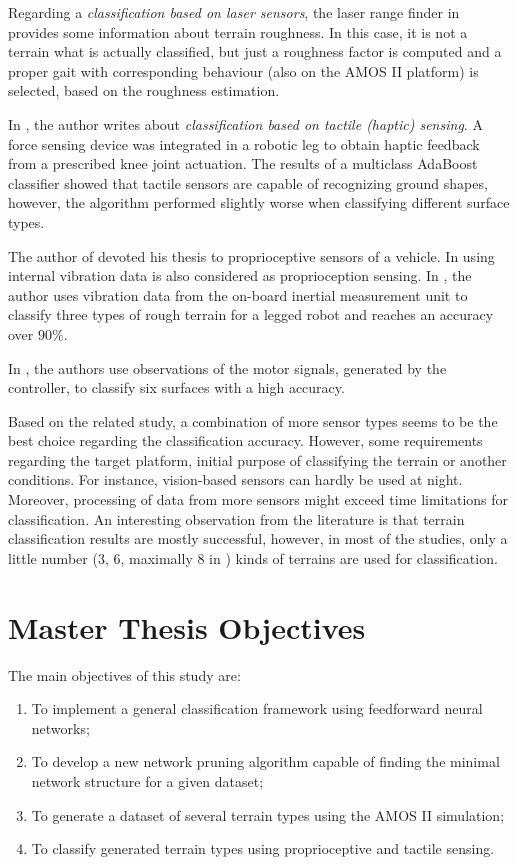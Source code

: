 Regarding a \textit{classification based on laser sensors}, the laser range finder in \citep{article:02:laser} provides some information about terrain roughness. In this case, it is not a terrain what is actually classified, but just a roughness factor is computed and a proper gait with corresponding behaviour (also on the AMOS II platform) is selected, based on the roughness estimation.

In \citep{article:06:haptic}, the author writes about \textit{classification based on tactile (haptic) sensing}. A force sensing device was integrated in a robotic leg to obtain haptic feedback from a prescribed knee joint actuation. The results of a multiclass AdaBoost classifier showed that tactile sensors are capable of recognizing ground shapes, however, the algorithm performed slightly worse when classifying different surface types.

The author of \citep{thesis:05:proprioception} devoted his thesis to proprioceptive sensors of a vehicle. In \citep{article:08:rhex} using internal vibration data is also considered as proprioception sensing. In \citep{article:09:roughterrain}, the author uses vibration data from the on-board inertial measurement unit to classify three types of rough terrain for a legged robot and reaches an accuracy over $ 90\% $.

In \citep{article:03:motorsignals}, the authors use observations of the motor signals, generated by the controller, to classify six surfaces with a high accuracy.

Based on the related study, a combination of more sensor types seems to be the best choice regarding the classification accuracy. However, some requirements regarding the target platform, initial purpose of classifying the terrain or another conditions. For instance, vision-based sensors can hardly be used at night. Moreover, processing of data from more sensors might exceed time limitations for classification. An interesting observation from the literature is that terrain classification results are mostly successful, however, in most of the studies, only a little number ($ 3 $, $ 6 $, maximally $ 8 $ in \citep{article:01:visual}) kinds of terrains are used for classification.

\section{Master Thesis Objectives} \label{sec:goals}
The main objectives of this study are:

\begin{enumerate}
\item To implement a general classification framework using feedforward neural networks;
\item To develop a new network pruning algorithm capable of finding the minimal network structure for a given dataset;
\item To generate a dataset of several terrain types using the AMOS II simulation;
\item To classify generated terrain types using proprioceptive and tactile sensing.
\end{enumerate}


